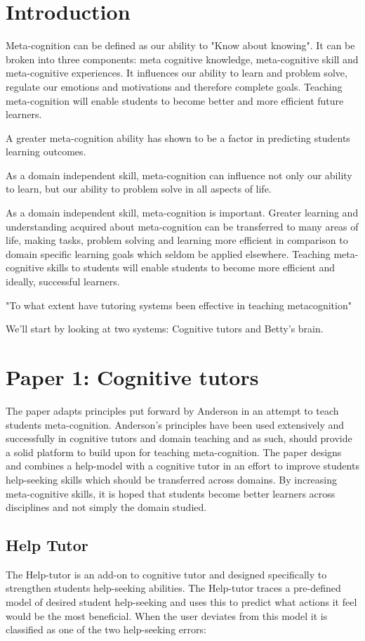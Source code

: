 \documentclass[11pt]{article}
\begin{document}
\section{Introduction}
Meta-cognition can be defined as our ability to "Know about knowing". It can be broken into three components: meta cognitive knowledge, meta-cognitive skill and meta-cognitive experiences. It influences our ability to learn and problem solve, regulate our emotions and motivations and therefore complete goals. Teaching meta-cognition will enable students to become better and more efficient future learners. 

A greater meta-cognition ability has shown to be a factor in predicting students learning outcomes. 

As a domain independent skill, meta-cognition can influence not only our ability to learn, but our ability to problem solve in all aspects of life.

As a domain independent skill, meta-cognition is important. Greater learning and understanding acquired about meta-cognition can be transferred to many areas of life, making tasks, problem solving and learning more efficient in comparison to domain specific learning goals which seldom be applied elsewhere. Teaching meta-cognitive skills to students will enable students to become more efficient and ideally, successful learners. 

"To what extent have tutoring systems been effective in teaching metacognition"

We'll start by looking at two systems: Cognitive tutors and Betty's brain.

\section{Paper 1: Cognitive tutors}

The paper adapts principles put forward by Anderson in an attempt to teach students meta-cognition. Anderson's principles have been used extensively and successfully in cognitive tutors and domain teaching and as such, should provide a solid platform to build upon for teaching meta-cognition. The paper designs and combines a help-model with a cognitive tutor in an effort to improve students help-seeking skills which should be transferred across domains. By increasing meta-cognitive skills, it is hoped that students become better learners across disciplines and not simply the domain studied. 

\subsection{Help Tutor}
The Help-tutor is an add-on to cognitive tutor and designed specifically to strengthen students help-seeking abilities. The Help-tutor traces a pre-defined model of desired student help-seeking and uses this to predict what actions it feel would be the most beneficial. When the user deviates from this model it is classified as one of the two help-seeking errors:
\end{document}
